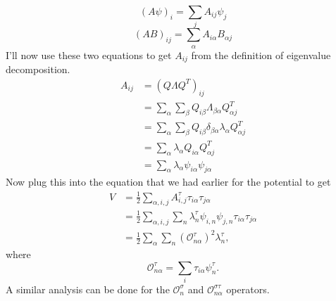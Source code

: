\documentclass[12pt]{extarticle}
\newcommand{\tia}{\tau_{i\alpha}}
\newcommand{\tja}{\tau_{j\alpha}}
\newcommand{\Aijt}{A^{\tau}_{i,j}}
\newcommand{\Ot}{\mathcal{O}^\tau_{n\alpha}}
\newcommand{\Os}{\mathcal{O}^\sigma_{n}}
\newcommand{\Ost}{\mathcal{O}^{\sigma\tau}_{n\alpha}}
\begin{document}
\begin{equation}
   (A\psi)_i = \sum\limits_jA_{ij}\psi_j
\end{equation}
\begin{equation}
   (AB)_{ij}=\sum\limits_\alpha A_{i\alpha} B_{\alpha j}
\end{equation}
I'll now use these two equations to get $A_{ij}$ from the definition of eigenvalue decomposition.
\begin{align}
   A_{ij} &= \left(Q\Lambda Q^T\right)_{ij} \\
   &=\sum\limits_\alpha\sum\limits_\beta Q_{i\beta}\Lambda_{\beta\alpha}Q^T_{\alpha j} \\
   &=\sum\limits_\alpha\sum\limits_\beta Q_{i\beta}\delta_{\beta\alpha}\lambda_\alpha Q^T_{\alpha j} \\
   &=\sum\limits_\alpha \lambda_\alpha Q_{i\alpha}Q^T_{\alpha j} \\
   &=\sum\limits_\alpha \lambda_\alpha \psi_{i\alpha}\psi_{j\alpha}
\end{align}
Now plug this into the equation that we had earlier for the potential to get
\begin{align}
   V &= \frac{1}{2}\sum\limits_{\alpha,i,j} \Aijt\tia\tja \\
   &= \frac{1}{2}\sum\limits_{\alpha,i,j}\sum\limits_n\lambda_n^\tau\psi_{i,n}\psi_{j,n}\tia\tja \\
   &= \frac{1}{2}\sum\limits_\alpha\sum\limits_n\left(\Ot\right)^2\lambda^\tau_n,
   \label{equ:Vtau}
\end{align}
where
\begin{equation}
   \Ot = \sum\limits_i \tau_{i\alpha}\psi^\tau_n.
\end{equation}
A similar analysis can be done for the $\Os$ and $\Ost$ operators.
\end{document}
